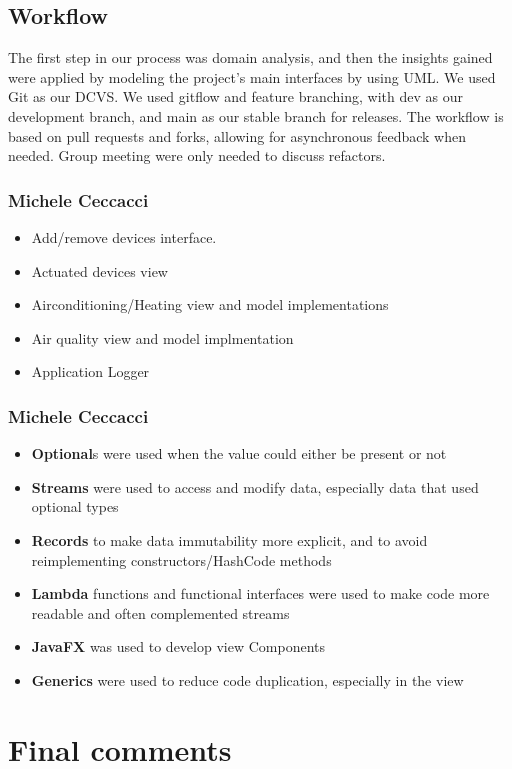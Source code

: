 \documentclass[a4paper,12pt]{report}
\begin{document}
\section{Workflow}
The first step in our process was domain analysis, and then the insights gained were applied by modeling 
the project's main interfaces by using UML. 
We used Git as our DCVS. We used gitflow and feature branching, with dev as our development branch,
and main as our stable branch for releases. The workflow is based on pull requests and forks, allowing for asynchronous feedback when needed.
Group meeting were only needed to discuss refactors. 

\subsection{Michele Ceccacci}
\begin{itemize}
	\item Add/remove devices interface.
	\item Actuated devices view
	\item Airconditioning/Heating view and model implementations
	\item Air quality view and model implmentation
	\item Application Logger 
\end{itemize}

\subsection{Michele Ceccacci}
\begin{itemize}
	\item \textbf{Optional}s were used when the value could either be present or not
	\item \textbf{Streams} were used to access and modify data, especially data that used optional types
	\item \textbf{Records} to make data immutability more explicit, and to avoid reimplementing constructors/HashCode methods
	\item \textbf{Lambda} functions and functional interfaces were used to make code more readable and often complemented streams 
	\item \textbf{JavaFX} was used to develop view Components
	\item \textbf{Generics} were used to reduce code duplication, especially in the view
\end{itemize}

\chapter{Final comments}
\end{document}
